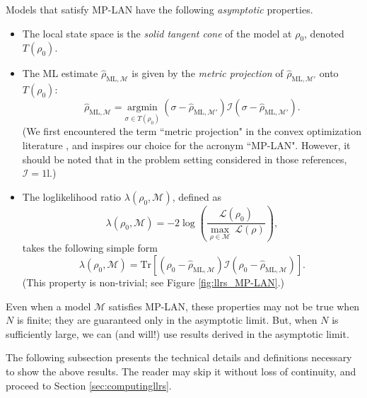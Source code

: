 \documentclass[aps,pra, twocolumn]{revtex4-1}
\newcommand{\M}{\mathcal{M}}
\newcommand{\cL}{\mathcal{L}}
\newcommand{\Id}{\mathbb{I}}
\def\Id{1\!\mathrm{l}}
\newcommand{\rhohat}{\hat{\rho}}
\newcommand{\rhoML}[1]{\rhohat_{\scriptscriptstyle{\mathrm{ML},#1}}}
\begin{document}
Models that satisfy MP-LAN have the following \emph{asymptotic} properties.
\begin{itemize}[nosep]
\item The local state space is the \emph{solid tangent cone} of the model at $\rho_{0}$, denoted $T(\rho_{0})$.
\item The ML estimate $\rhoML{\M}$ is given by the \emph{metric projection} of $\rhoML{\M'}$ onto $T(\rho_{0})$:
\begin{equation}
\label{eq:MP-LANmle}
\rhoML{\M} = \underset{\sigma \in T(\rho_{0})}{\text{argmin}}~(\sigma  -\rhoML{\M'})\mathcal{I}(\sigma  -\rhoML{\M'}).
\end{equation}
(We first encountered the term ``metric projection" in the convex optimization literature \cite{McCoy2014, Amelunxen2014}, and inspires our choice for the acronym ``MP-LAN". However, it should be noted that in the problem setting considered in those references, $\mathcal{I} = \Id$.)

\item The loglikelihood ratio $\lambda(\rho_{0}, \M)$, defined as
\begin{equation}
\label{eq:llrs_lan_2}
\lambda(\rho_{0}, \M) = -2 \log \left(\frac{\cL(\rho_{0})}{\underset{\rho \in \M}{\max}~\cL(\rho)}\right),
\end{equation}
takes the following simple form
\begin{equation}
\label{eq:llrs_lan}
\lambda(\rho_{0}, \M) =  \mathrm{Tr}[(\rho_{0} - \rhoML{\M})\mathcal{I}(\rho_{0} - \rhoML{\M})].
\end{equation}
(This property is non-trivial; see Figure \ref{fig:llrs_MP-LAN}.)
\end{itemize}



Even when a model $\M$ satisfies MP-LAN, these properties may not be true when $N$ is finite; they are guaranteed only in the asymptotic limit. But, when $N$ is sufficiently large, we can (and will!) use results derived in the asymptotic limit.

The following subsection presents the technical details and definitions necessary to show the above results. The reader may skip it without loss of continuity, and proceed to Section \ref{sec:computingllrs}.
\end{document}
